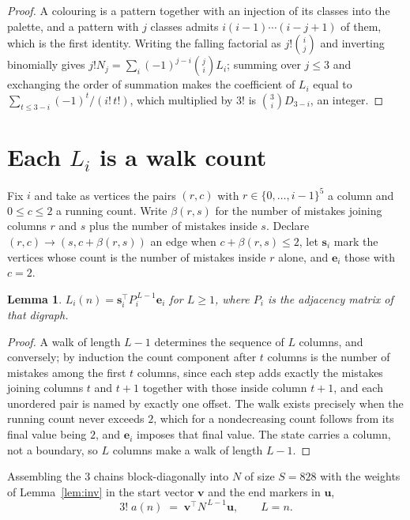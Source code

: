 \documentclass[11pt,a4paper]{article}
\theoremstyle{plain}
\newtheorem{lemma}[theorem]{Lemma}
\theoremstyle{definition}
\begin{document}
\begin{proof}
A colouring is a pattern together with an injection of its classes into the palette, and a
pattern with $j$ classes admits $i(i-1)\cdots(i-j+1)$ of them, which is the first identity.
Writing the falling factorial as $j!\binom{i}{j}$ and inverting binomially gives
$j!N_j=\sum_i(-1)^{j-i}\binom{j}{i}L_i$; summing over $j\le3$ and exchanging the order
of summation makes the coefficient of $L_i$ equal to $\sum_{t\le3-i}(-1)^t/(i!\,t!)$,
which multiplied by $3!$ is $\binom{3}{i}D_{3-i}$, an integer.
\end{proof}

\section{Each $L_i$ is a walk count}

Fix $i$ and take as vertices the pairs $(r,c)$ with $r\in\{0,\dots,i-1\}^{5}$ a column
and $0\le c\le2$ a running count. Write $\beta(r,s)$ for the number of mistakes joining
columns $r$ and $s$ plus the number of mistakes inside $s$. Declare $(r,c)\to(s,c+\beta(r,s))$
an edge when $c+\beta(r,s)\le2$, let $\mathbf{s}_i$ mark the vertices whose count is the
number of mistakes inside $r$ alone, and $\mathbf{e}_i$ those with $c=2$.

\begin{lemma}\label{lem:walk}
$L_i(n)=\mathbf{s}_i^{\!\top}P_i^{\,L-1}\mathbf{e}_i$ for $L\ge1$, where $P_i$ is the
adjacency matrix of that digraph.
\end{lemma}

\begin{proof}
A walk of length $L-1$ determines the sequence of $L$ columns, and conversely; by induction
the count component after $t$ columns is the number of mistakes among the first $t$ columns,
since each step adds exactly the mistakes joining columns $t$ and $t+1$ together with those
inside column $t+1$, and each unordered pair is named by exactly one offset. The walk exists
precisely when the running count never exceeds $2$, which for a nondecreasing count follows
from its final value being $2$, and $\mathbf{e}_i$ imposes that final value. The state
carries a column, not a boundary, so $L$ columns make a walk of length $L-1$.
\end{proof}

Assembling the $3$ chains block-diagonally into $N$ of size $S=828$ with the weights of
Lemma~\ref{lem:inv} in the start vector $\mathbf{v}$ and the end markers in
$\mathbf{u}$,
\begin{equation}\label{eq:walk2}
3!\;a(n)\;=\;\mathbf{v}^{\!\top}N^{\,L-1}\mathbf{u},\qquad L=n .
\end{equation}
\end{document}
